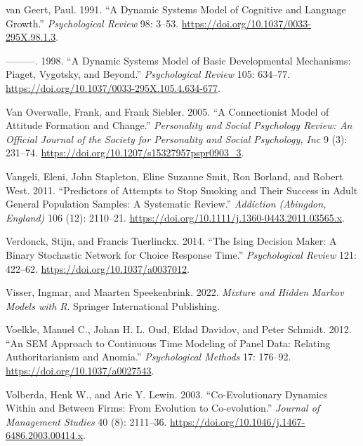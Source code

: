 \documentclass[
  a4paper,
  DIV=11,
  numbers=noendperiod,
  oneside]{scrreprt}
\newlength{\cslhangindent}
\newenvironment{CSLReferences}[2] %
 {\begin{list}{}{%
  \setlength{\itemindent}{0pt}
  \setlength{\leftmargin}{0pt}
  \setlength{\parsep}{0pt}
  \ifodd #1
   \setlength{\leftmargin}{\cslhangindent}
   \setlength{\itemindent}{-1\cslhangindent}
  \fi
  \setlength{\itemsep}{#2\baselineskip}}}
 {\end{list}}
\begin{document}
\begin{CSLReferences}{1}{0}
van Geert, Paul. 1991. {``A Dynamic Systems Model of Cognitive and
Language Growth.''} \emph{Psychological Review} 98: 3--53.
\url{https://doi.org/10.1037/0033-295X.98.1.3}.

---------. 1998. {``A Dynamic Systems Model of Basic Developmental
Mechanisms: {Piaget}, {Vygotsky}, and Beyond.''} \emph{Psychological
Review} 105: 634--77.
\url{https://doi.org/10.1037/0033-295X.105.4.634-677}.

Van Overwalle, Frank, and Frank Siebler. 2005. {``A Connectionist Model
of Attitude Formation and Change.''} \emph{Personality and Social
Psychology Review: An Official Journal of the Society for Personality
and Social Psychology, Inc} 9 (3): 231--74.
\url{https://doi.org/10.1207/s15327957pspr0903_3}.

Vangeli, Eleni, John Stapleton, Eline Suzanne Smit, Ron Borland, and
Robert West. 2011. {``Predictors of Attempts to Stop Smoking and Their
Success in Adult General Population Samples: A Systematic Review.''}
\emph{Addiction (Abingdon, England)} 106 (12): 2110--21.
\url{https://doi.org/10.1111/j.1360-0443.2011.03565.x}.

Verdonck, Stijn, and Francis Tuerlinckx. 2014. {``The {Ising Decision
Maker}: {A} Binary Stochastic Network for Choice Response Time.''}
\emph{Psychological Review} 121: 422--62.
\url{https://doi.org/10.1037/a0037012}.

Visser, Ingmar, and Maarten Speekenbrink. 2022. \emph{Mixture and
{Hidden Markov Models} with {R}}. {Springer International Publishing}.

Voelkle, Manuel C., Johan H. L. Oud, Eldad Davidov, and Peter Schmidt.
2012. {``An {SEM} Approach to Continuous Time Modeling of Panel Data:
{Relating} Authoritarianism and Anomia.''} \emph{Psychological Methods}
17: 176--92. \url{https://doi.org/10.1037/a0027543}.

Volberda, Henk W., and Arie Y. Lewin. 2003. {``Co-Evolutionary {Dynamics
Within} and {Between Firms}: {From Evolution} to {Co-evolution}.''}
\emph{Journal of Management Studies} 40 (8): 2111--36.
\url{https://doi.org/10.1046/j.1467-6486.2003.00414.x}.


\end{CSLReferences}
\end{document}
